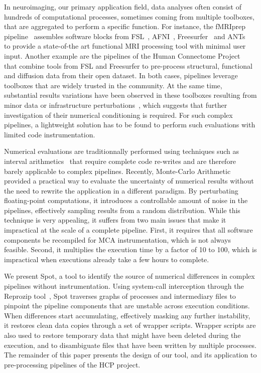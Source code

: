 \documentclass[a4paper,num-refs]{oup-contemporary}
\begin{document}
In neuroimaging, our primary application field, data analyses often consist
of hundreds of computational processes, sometimes coming from multiple
toolboxes, that are aggregated to perform a specific function. For
instance, the fMRIprep pipeline~\cite{esteban2019fmriprep} assembles software blocks
from FSL~\cite{jenkinson2012fsl}, AFNI~\cite{cox2012afni}, Freesurfer~\cite{fischl2012freesurfer} and ANTs~\cite{avants2009advanced} to provide a state-of-the art
functional MRI processing tool with minimal user input. Another example are the pipelines of the Human
Connectome Project~\cite{glasser2013} that combine tools from FSL and Freesurfer to pre-process
structural, functional and diffusion data from their
open dataset. In both cases, pipelines leverage toolboxes that are
widely trusted in the community. At the same time, substantial results
variations have been observed in these toolboxes resulting from minor data
or infrastructure perturbations~\cite{Glatard2015, Gronenschild2012, Lewis2017-ll}, which suggests that further investigation of their
numerical conditioning is required. For such complex pipelines, a
lightweight solution has to be found to perform such evaluations with
limited code instrumentation.

Numerical evaluations are traditionnally performed using techniques such as
interval arithmetics~\cite{hickey2001interval} that require complete code re-writes and are
therefore barely applicable to complex pipelines. Recently, Monte-Carlo
Arithmetic~\cite{Parker1997-qq, Denis2016-wo} provided a practical way to
evaluate the uncertainty of numerical results without the need to rewrite
the application in a different paradigm. By perturbating floating-point
computations, it introduces a controllable amount of noise in the
pipelines, effectively sampling results from a random distribution. While
this technique is very appealing, it suffers from two main issues that make
it impractical at the scale of a complete pipeline. First, it requires that
all software components be recompiled for MCA instrumentation, which is not
always feasible. Second, it multiplies the execution time by a factor of 10
to 100, which is impractical when executions already take a few hours to
complete. 

We present Spot, a tool to identify the source of numerical differences in
complex pipelines without instrumentation. Using system-call interception
through the Reprozip tool~\cite{chirigati2016reprozip}, Spot traverses graphs of processes and
intermediary files to pinpoint the pipeline components that are unstable
across execution conditions. When differences start accumulating,
effectively masking any further instability, it restores clean data copies
through a set of wrapper scripts. Wrapper scripts are also used to restore
temporary data that might have been deleted during the execution, and to
disambiguate files that have been written by multiple processes. The remainder of this paper 
presents the design of our tool, and its 
application to pre-processing pipelines of the HCP project. 
\end{document}
